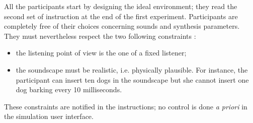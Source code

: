 \documentclass[preprint,12pt]{elsarticle}
\newcommand{\cf}{cf.}
\begin{document}
All the participants start by designing the ideal environment; they read the second set of instruction at the end of the first experiment. Participants are completely free of their choices concerning sounds and synthesis parameters. They must nevertheless respect the two following constraints :
\begin{itemize}
\item the listening point of view is the one of a fixed listener;
\item the soundscape must be realistic, i.e. physically plausible. For instance, the participant can insert ten dogs in the soundscape but she cannot insert one dog barking every 10 milliseconds.
\end{itemize}

These constraints are notified in the instructions; no control is done \emph{a priori} in the simulation user interface.


%
%
%
%
\end{document}
